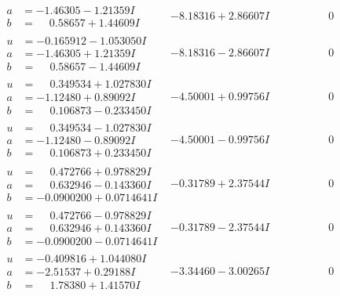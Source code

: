 \documentclass[1p]{elsarticle_modified}
\theoremstyle{definition}
\begin{document}
$$\begin{array}{c|c|c}
\begin{aligned}
a &= -1.46305 - 1.21359 I \\
b &= \phantom{-}0.58657 + 1.44609 I\end{aligned}
 & -8.18316 + 2.86607 I & \phantom{-0.000000 } 0 \\ \hline\begin{aligned}
u &= -0.165912 - 1.053050 I \\
a &= -1.46305 + 1.21359 I \\
b &= \phantom{-}0.58657 - 1.44609 I\end{aligned}
 & -8.18316 - 2.86607 I & \phantom{-0.000000 } 0 \\ \hline\begin{aligned}
u &= \phantom{-}0.349534 + 1.027830 I \\
a &= -1.12480 + 0.89092 I \\
b &= \phantom{-}0.106873 - 0.233450 I\end{aligned}
 & -4.50001 + 0.99756 I & \phantom{-0.000000 } 0 \\ \hline\begin{aligned}
u &= \phantom{-}0.349534 - 1.027830 I \\
a &= -1.12480 - 0.89092 I \\
b &= \phantom{-}0.106873 + 0.233450 I\end{aligned}
 & -4.50001 - 0.99756 I & \phantom{-0.000000 } 0 \\ \hline\begin{aligned}
u &= \phantom{-}0.472766 + 0.978829 I \\
a &= \phantom{-}0.632946 - 0.143360 I \\
b &= -0.0900200 + 0.0714641 I\end{aligned}
 & -0.31789 + 2.37544 I & \phantom{-0.000000 } 0 \\ \hline\begin{aligned}
u &= \phantom{-}0.472766 - 0.978829 I \\
a &= \phantom{-}0.632946 + 0.143360 I \\
b &= -0.0900200 - 0.0714641 I\end{aligned}
 & -0.31789 - 2.37544 I & \phantom{-0.000000 } 0 \\ \hline\begin{aligned}
u &= -0.409816 + 1.044080 I \\
a &= -2.51537 + 0.29188 I \\
b &= \phantom{-}1.78380 + 1.41570 I\end{aligned}
 & -3.34460 - 3.00265 I & \phantom{-0.000000 } 0 \\ \hline\begin{aligned}

\end{aligned}
\end{array}$$
\end{document}
